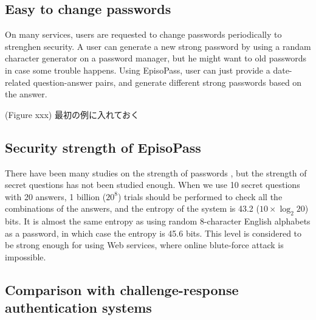 \documentclass{article}
\begin{document}
\subsection{Easy to change passwords}

On many services, users are requested to change passwords periodically
to strenghen security.
A user can generate a new strong password by using a randam character generator
on a password manager, but he might want to old passwords in case some trouble happens.
Using EpisoPass, user can just provide a date-related question-answer pairs,
and generate different strong passwords based on the answer.

(Figure xxx) 最初の例に入れておく

\subsection{Security strength of EpisoPass}

There have been many studies on the strength of passwords
\cite{Hayashi:2011:DSP:1978942.1979326}%
\cite{Komanduri:2011:PPM:1978942.1979321}, %
but the strength of secret questions has not been studied enough.
%
%
When we use 10 secret questions with 20 answers,
1 billion ($20^8$) trials should be performed to check
all the combinations of the answers,
and the entropy of the system is 43.2 ($10 \times \log_2 20$) bits.  %
%
%
It is almost the same entropy as using random 8-character English alphabets
as a password, in which case the entropy is 45.6 bits.
This level is considered to be strong enough for using Web services,
where online blute-force attack is impossible\cite{Florencio:2007:SWP:1361419.1361429}.

\subsection{Comparison with challenge-response authentication systems}
\end{document}
